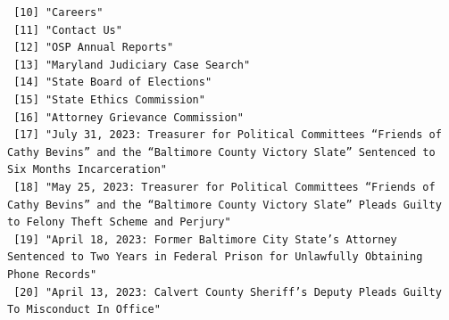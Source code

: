 \documentclass[
  letterpaper,
  DIV=11,
  numbers=noendperiod]{scrreprt}
\begin{document}
\begin{verbatim}
 [10] "Careers"                                                                                                                                                                                                                                             
 [11] "Contact Us"                                                                                                                                                                                                                                          
 [12] "OSP Annual Reports"                                                                                                                                                                                                                                  
 [13] "Maryland Judiciary Case Search"                                                                                                                                                                                                                      
 [14] "State Board of Elections"                                                                                                                                                                                                                            
 [15] "State Ethics Commission"                                                                                                                                                                                                                             
 [16] "Attorney Grievance Commission"                                                                                                                                                                                                                       
 [17] "July 31, 2023: Treasurer for Political Committees “Friends of Cathy Bevins” and the “Baltimore County Victory Slate” Sentenced to Six Months Incarceration"                                                                                          
 [18] "May 25, 2023: Treasurer for Political Committees “Friends of Cathy Bevins” and the “Baltimore County Victory Slate” Pleads Guilty to Felony Theft Scheme and Perjury"                                                                                
 [19] "April 18, 2023: Former Baltimore City State’s Attorney Sentenced to Two Years in Federal Prison for Unlawfully Obtaining Phone Records"                                                                                                              
 [20] "April 13, 2023: Calvert County Sheriff’s Deputy Pleads Guilty To Misconduct In Office"                                                                                                                                                               

\end{verbatim}
\end{document}
